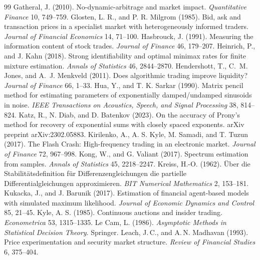 \documentclass[12pt]{article}
\theoremstyle{definition}
\theoremstyle{remark}
\begin{document}
\begin{thebibliography}{99}
 Gatheral, J. (2010). No-dynamic-arbitrage and market impact. \emph{Quantitative Finance} 10, 749--759.
 Glosten, L. R., and P. R. Milgrom (1985). Bid, ask and transaction prices in a specialist market with heterogeneously informed traders. \emph{Journal of Financial Economics} 14, 71--100.
 Hasbrouck, J. (1991). Measuring the information content of stock trades. \emph{Journal of Finance} 46, 179--207.
 Heinrich, P., and J. Kahn (2018). Strong identifiability and optimal minimax rates for finite mixture estimation. \emph{Annals of Statistics} 46, 2844--2870.
 Hendershott, T., C.~M. Jones, and A.~J. Menkveld (2011). Does algorithmic trading improve liquidity? \emph{Journal of Finance} 66, 1--33.
 Hua, Y., and T. K. Sarkar (1990). Matrix pencil method for estimating parameters of exponentially damped/undamped sinusoids in noise. \emph{IEEE Transactions on Acoustics, Speech, and Signal Processing} 38, 814--824.
 Katz, R., N. Diab, and D. Batenkov (2023). On the accuracy of Prony's method for recovery of exponential sums with closely spaced exponents. arXiv preprint arXiv:2302.05883.
 Kirilenko, A., A. S. Kyle, M. Samadi, and T. Tuzun (2017). The Flash Crash: High-frequency trading in an electronic market. \emph{Journal of Finance} 72, 967--998.
 Kong, W., and G. Valiant (2017). Spectrum estimation from samples. \emph{Annals of Statistics} 45, 2218--2247.
 Kreiss, H.-O. (1962). \"Uber die Stabilit\"atsdefinition f\"ur Differenzengleichungen die partielle Differentialgleichungen approximieren. \emph{BIT Numerical Mathematics} 2, 153--181.
 Kukacka, J., and J. Barunik (2017). Estimation of financial agent-based models with simulated maximum likelihood. \emph{Journal of Economic Dynamics and Control} 85, 21--45.
 Kyle, A. S. (1985). Continuous auctions and insider trading. \emph{Econometrica} 53, 1315--1335.
 Le Cam, L. (1986). \emph{Asymptotic Methods in Statistical Decision Theory}. Springer.
 Leach, J.\,C., and A.\,N. Madhavan (1993). Price experimentation and security market structure. \emph{Review of Financial Studies} 6, 375--404.


\end{thebibliography}
\end{document}
